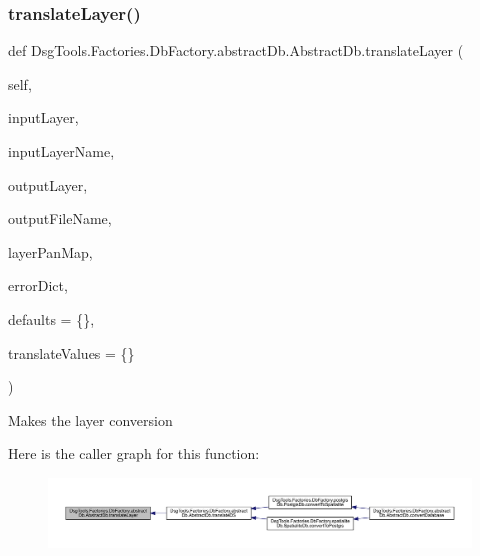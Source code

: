 \subsubsection{\texorpdfstring{translate\+Layer()}{translateLayer()}}
{\footnotesize\ttfamily def Dsg\+Tools.\+Factories.\+Db\+Factory.\+abstract\+Db.\+Abstract\+Db.\+translate\+Layer (\begin{DoxyParamCaption}\item[{}]{self,  }\item[{}]{input\+Layer,  }\item[{}]{input\+Layer\+Name,  }\item[{}]{output\+Layer,  }\item[{}]{output\+File\+Name,  }\item[{}]{layer\+Pan\+Map,  }\item[{}]{error\+Dict,  }\item[{}]{defaults = {\ttfamily \{\}},  }\item[{}]{translate\+Values = {\ttfamily \{\}} }\end{DoxyParamCaption})}

\begin{DoxyVerb}Makes the layer conversion
\end{DoxyVerb}
 Here is the caller graph for this function\+:
\nopagebreak
\begin{figure}[H]
\begin{center}
\leavevmode
\includegraphics[width=350pt]{class_dsg_tools_1_1_factories_1_1_db_factory_1_1abstract_db_1_1_abstract_db_a4b923803b78556b8c1f812e44345c460_icgraph}
\end{center}
\end{figure}
\mbox{\label{class_dsg_tools_1_1_factories_1_1_db_factory_1_1abstract_db_1_1_abstract_db_a170002788b3252443f4458e055207825}} 
